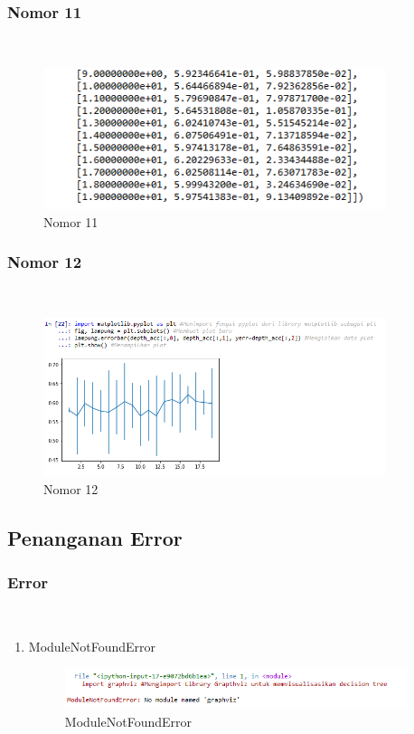 \subsubsection{Nomor 11}
\hfill\\

\begin{figure}[H]
\centerline{\includegraphics[width=10cm]{figures/1174087/2/p11.png}}
\caption{Nomor 11}
\label{labelgambar}
\end{figure}

\subsubsection{Nomor 12}
\hfill\\

\begin{figure}[H]
\centerline{\includegraphics[width=10cm]{figures/1174087/2/p12.png}}
\caption{Nomor 12}
\label{labelgambar}
\end{figure}

\subsection{Penanganan Error}
\subsubsection{Error}
\hfill\\
\begin{enumerate}
\item ModuleNotFoundError

\begin{figure}[H]
\centerline{\includegraphics[width=10cm]{figures/1174087/2/error1.png}}
\caption{ModuleNotFoundError}
\label{labelgambar}
\end{figure}
\end{enumerate}

